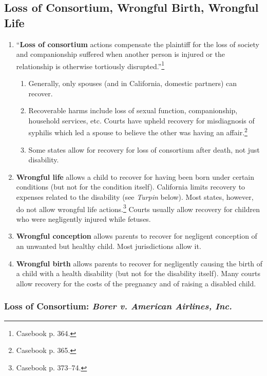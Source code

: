 \subsection{Loss of Consortium, Wrongful Birth, Wrongful Life}

\begin{enumerate}
    \item ``\textbf{Loss of consortium} actions compensate the plaintiff for 
    the loss of society and companionship suffered when another person is 
    injured or the relationship is otherwise tortiously 
    disrupted.''\footnote{Casebook p. 364.}
    \begin{enumerate}
        \item Generally, only spouses (and in California, domestic partners) 
        can recover.
        \item Recoverable harms include loss of sexual function, 
        companionship, household services, etc. Courts have upheld recovery 
        for misdiagnosis of syphilis which led a spouse to believe the other 
        was having an affair.\footnote{Casebook p. 365.}
        \item Some states allow for recovery for loss of consortium after 
        death, not just disability. %
    \end{enumerate}
    \item \textbf{Wrongful life} allows a child to recover for having been 
    born under certain conditions (but not for the condition itself). 
    California limits recovery to expenses related to the disability (see 
    \emph{Turpin} below). Most states, however, do not allow wrongful life 
    actions.\footnote{Casebook p. 373--74.} Courts usually allow recovery for 
    children who were negligently injured while fetuses.
    \item \textbf{Wrongful conception} allows parents to recover for negligent 
    conception of an unwanted but healthy child. Most jurisdictions allow it.
    \item \textbf{Wrongful birth} allows parents to recover for negligently 
    causing the birth of a child with a health disability (but not for the 
    disability itself). Many courts allow recovery for the costs of the 
    pregnancy and of raising a disabled child.
\end{enumerate}

\subsubsection{Loss of Consortium: \emph{Borer v. American 
Airlines, Inc.}}


